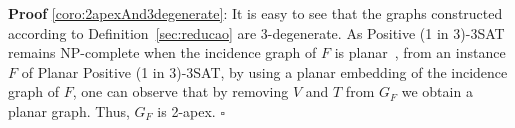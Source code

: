 \documentclass[9pt]{entcs}
\begin{document}
\begin{prove*} \textbf{Proof} \ref{coro:2apexAnd3degenerate}:
It is easy to see that the graphs constructed according to Definition~\ref{sec:reducao} are $3$-degenerate.
As {\sc Positive (1 in 3)-3SAT} remains NP-complete when the incidence graph of $F$ is planar~\cite{mulzer2008minimum}, from an instance $F$ of {\sc Planar Positive (1 in 3)-3SAT}, by using a planar embedding of the incidence graph of $F$, one can observe that by removing $V$ and $T$ from $G_F$ we obtain a planar graph. Thus, $G_F$ is 2-apex. 
$\square$ \end{prove*}
\end{document}
